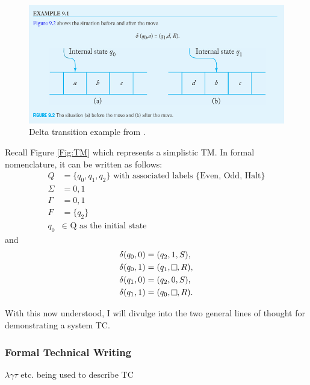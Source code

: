 \begin{figure}[htb]
    \centering
    \includegraphics[width=16cm]{Images/deltatransition.png}
       \caption{Delta transition example from \cite{IntroFormLangAuto}.}
           \label{Fig:DeltaTransition}
\end{figure}

Recall Figure \ref{Fig:TM} which represents a simplistic TM.
In formal nomenclature, it can be written as follows:
\[
    \begin{aligned}
        Q &= \{q_{0}, q_{1}, q_{2}\} \text{ with associated labels \{Even, Odd, Halt\}}\\
        \Sigma &= {0,1}\\
        \Gamma &= {0,1}\\
        F &= \{q_{2}\}\\
        q_{0} &\in \text{ Q as the initial state}
    \end{aligned}
\]
and
\[
    \begin{aligned}
        \delta (q_{0}, 0) &= (q_{2}, 1, S),\\
        \delta (q_{0}, 1) &= (q_{1}, \raisebox{0.1cm}{\fbox{}}, R),\\
        \delta (q_{1}, 0) &= (q_{2}, 0, S),\\
        \delta (q_{1}, 1) &= (q_{0}, \raisebox{0.1cm}{\fbox{}}, R).\\
    \end{aligned}
\]

With this now understood, I will divulge into the two general lines of thought for demonstrating a system TC.

\subsubsection{Formal Technical Writing}\label{subsubsec:FormalWriting}

$\lambda \gamma \tau $ etc. being used to describe TC

